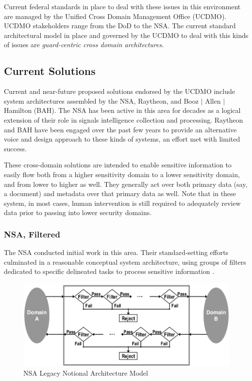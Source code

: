 \documentclass[12pt,letterpaper]{article}
\begin{document}
Current federal standards in place to deal with these issues in this environment are managed by the Unified Cross Domain Management Office (UCDMO).  UCDMO stakeholders range from the DoD to the NSA.  The current standard architectural model in place and governed by the UCDMO to deal with this kinds of issues are \textit{guard-centric cross domain architectures}.

\subsection{Current Solutions}
Current and near-future proposed solutions endorsed by the UCDMO include system architectures assembled by the NSA, Raytheon, and Booz $\mid$  Allen $\mid$  Hamilton (BAH).   The NSA has been active in this area for decades as a logical extension of their role in signals intelligence collection and processing.  Raytheon and BAH have been engaged over the past few years to provide an alternative voice and design approach to these kinds of systems, an effort met with limited success.

These cross-domain solutions are intended to enable sensitive information to easily flow both from a higher sensitivity domain to a lower sensitivity domain, and from lower to higher as well.  They generally act over both primary data (say, a document) and metadata over that primary data as well.  Note that in these system, in most cases, human intervention is still required to adequately review data prior to passing into lower security domains.

\subsubsection{NSA, Filtered}
The NSA conducted initial work in this area.  Their standard-setting efforts culminated in a reasonable conceptual system architecture, using groups of filters dedicated to specific delineated tasks to process sensitive information \cite{proposal:nsa-arch}.

\begin{figure}[!t]
\centering
\includegraphics[width=5in]{nsa-legacy-arch}
\caption{NSA Legacy Notional Architecture Model}
\label{fig:model:conceptual-model}
\end{figure}
\end{document}
